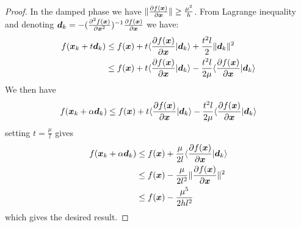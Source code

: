  \begin{proof}
   In the damped phase we have  $\| \partialfrac{\xb}{f(\xb)} \| \geq
   \frac{\mu^2}{h}$.
   From Lagrange inequality and denoting $\db_k = -(\partialfrac{\xb^2}{^2 f(\xb)})^{-1} \partialfrac{\xb}{f(\xb)}$ we have:
   \begin{align}
     f(\xb_k + t \db_k) & \leq f(\xb) + t \langle \partialfrac{\xb}{f(\xb)} | \db_k \rangle  +  \frac{t^2 l}{2} \|\db_k\|^2 \\
                        & \leq f(\xb) + t \langle \partialfrac{\xb}{f(\xb)} | \db_k \rangle  -  \frac{t^2 l}{2 \mu} \langle \partialfrac{\xb}{f(\xb)} | \db_k \rangle \\
   \end{align}
   We then have 
   \begin{align}
     &  f(\xb_k + \alpha \db_k)  \leq f(\xb) + t \langle \partialfrac{\xb}{f(\xb)} | \db_k \rangle  -  \frac{t^2 l}{2 \mu} \langle \partialfrac{\xb}{f(\xb)} | \db_k \rangle \\
   \end{align}
   setting $t = \frac{\mu}{l}$ gives
   \begin{align}
       f(\xb_k +\alpha \db_k)  &\leq f(\xb) + \frac{\mu}{2l} \langle \partialfrac{\xb}{f(\xb)} | \db_k \rangle  \\
     &\leq f(\xb) - \frac{\mu}{2l^2} \|\partialfrac{\xb}{f(\xb)}\|^2  \\
     &\leq f(\xb) - \frac{\mu^5}{2h l^2} \\
   \end{align}
   which gives the desired result.


\end{proof}
